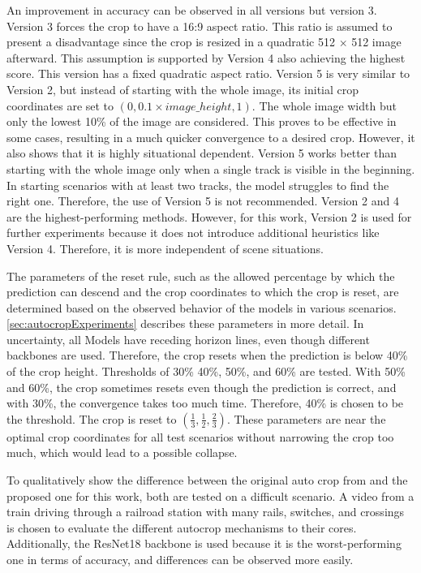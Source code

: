 \noindent An improvement in accuracy can be observed in all versions but version 3.
Version 3 forces the crop to have a 16:9 aspect ratio.
This ratio is assumed to present a disadvantage since the crop is resized in a quadratic 512 $\times$ 512 image afterward.
This assumption is supported by Version 4 also achieving the highest score.
This version has a fixed quadratic aspect ratio.
Version 5 is very similar to Version 2, but instead of starting with the whole image, its initial crop coordinates are set to $(0, 0.1 \times image\_height, 1)$.
The whole image width but only the lowest 10\% of the image are considered.
This proves to be effective in some cases, resulting in a much quicker convergence to a desired crop.
However, it also shows that it is highly situational dependent.
Version 5 works better than starting with the whole image only when a single track is visible in the beginning.
In starting scenarios with at least two tracks, the model struggles to find the right one. Therefore, the use of Version 5 is not recommended.
Version 2 and 4 are the highest-performing methods.
However, for this work, Version 2 is used for further experiments because it does not introduce additional heuristics like Version 4.
Therefore, it is more independent of scene situations.

The parameters of the reset rule, such as the allowed percentage by which the prediction can descend and the crop coordinates to which the crop is reset, are determined based on the observed behavior of the models in various scenarios.
\autoref{sec:autocropExperiments} describes these parameters in more detail.
In uncertainty, all Models have receding horizon lines, even though different backbones are used.
Therefore, the crop resets when the prediction is below 40\% of the crop height.
Thresholds of 30\% 40\%, 50\%, and 60\% are tested.
With 50\% and 60\%, the crop sometimes resets even though the prediction is correct, and with 30\%, the convergence takes too much time.
Therefore, 40\% is chosen to be the threshold.
The crop is reset to $(\frac{1}{3}, \frac{1}{2}, \frac{2}{3})$.
These parameters are near the optimal crop coordinates for all test scenarios without narrowing the crop too much, which would lead to a possible collapse.

\vspace{0.5cm}

\noindent To qualitatively show the difference between the original auto crop from \cite{tepNet2024} and the proposed one for this work, both are tested on a difficult scenario.
A video from a train driving through a railroad station with many rails, switches, and crossings is chosen to evaluate the different autocrop mechanisms to their cores.
Additionally, the ResNet18 backbone is used because it is the worst-performing one in terms of accuracy, and differences can be observed more easily.


